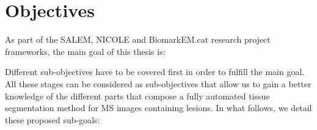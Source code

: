 \section{Objectives}
\label{sec:objectives}

As part of the SALEM, NICOLE and BiomarkEM.cat research project frameworks, the main goal of this thesis is: 

\begin{center}
\end{center}

\noindent Different sub-objectives have to be covered first in order to fulfill the main goal. All these stages can be considered as sub-objectives that allow us to gain a better knowledge of the different parts that compose a fully automated tissue segmentation method for MS images containing lesions. In what follows, we detail these proposed sub-goals: 

